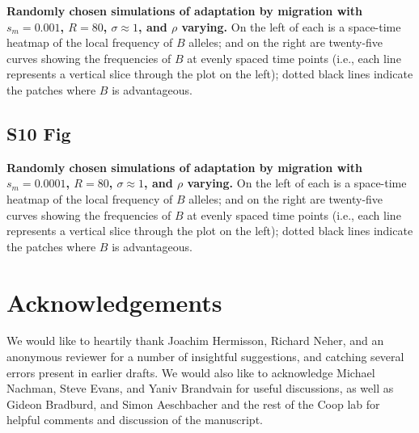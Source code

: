 \documentclass[10pt,letterpaper]{article}
\begin{document}
\textbf{Randomly chosen simulations of adaptation by migration
with $s_m=0.001$, $R=80$, $\sigma\approx 1$, and $\rho$ varying.}
    On the left of each is a space-time heatmap of the local frequency of $B$ alleles;
    and on the right are twenty-five curves showing the frequencies of $B$ at evenly spaced time points
    (i.e., each line represents a vertical slice through the plot on the left);
    dotted black lines indicate the patches where $B$ is advantageous.

\subsection*{S10 Fig}
\label{sfig:sims_8}

\textbf{Randomly chosen simulations of adaptation by migration
with $s_m=0.0001$, $R=80$, $\sigma\approx 1$, and $\rho$ varying.}
    On the left of each is a space-time heatmap of the local frequency of $B$ alleles;
    and on the right are twenty-five curves showing the frequencies of $B$ at evenly spaced time points
    (i.e., each line represents a vertical slice through the plot on the left);
    dotted black lines indicate the patches where $B$ is advantageous.


\section*{Acknowledgements}
We would like to heartily thank Joachim Hermisson, Richard Neher, and an anonymous reviewer
for a number of insightful suggestions,
and catching several errors present in earlier drafts. 
We would also like to acknowledge Michael Nachman, Steve Evans, and Yaniv Brandvain for useful discussions, 
as well as Gideon Bradburd, and Simon Aeschbacher and the rest of the Coop lab
for helpful comments and discussion of the manuscript.
\end{document}
